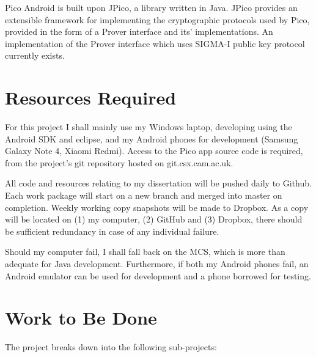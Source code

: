 \documentclass[12pt,a4paper,twoside]{article}
\begin{document}
Pico Android is built upon JPico, a library written in Java. JPico provides an extensible framework for implementing the cryptographic protocols used by Pico, provided in the form of a Prover interface and its’ implementations. An implementation of the Prover interface which uses SIGMA-I public key protocol currently exists.

\section*{Resources Required}

For this project I shall mainly use my Windows laptop, developing using the Android SDK and eclipse, and my Android phones for development (Samsung Galaxy Note 4, Xiaomi Redmi). Access to the Pico app source code is required, from the project’s git repository hosted on git.csx.cam.ac.uk. 

All code and resources relating to my dissertation will be pushed daily to Github. Each work package will start on a new branch and merged into master on completion. Weekly working copy snapshots will be made to Dropbox. As a copy will be located on (1) my computer, (2) GitHub and (3) Dropbox, there should be sufficient redundancy in case of any individual failure. 

Should my computer fail, I shall fall back on the MCS, which is more than adequate for Java development. Furthermore, if both my Android phones fail, an Android emulator can be used for development and a phone borrowed for testing.


\section*{Work to Be Done}

The project breaks down into the following sub-projects:
\end{document}
